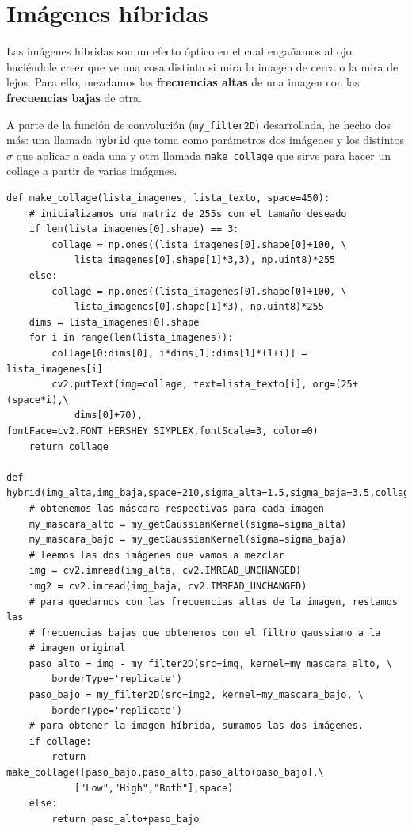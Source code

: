 \documentclass[11pt,a4paper]{article}
\theoremstyle{plain}
\theoremstyle{definition}
\begin{document}
\section{Imágenes híbridas}

Las imágenes híbridas son un efecto óptico en el cual engañamos al ojo haciéndole creer que ve una cosa distinta si mira la imagen de cerca o la mira de lejos. Para ello, mezclamos las \textbf{frecuencias altas} de una imagen con las \textbf{frecuencias bajas} de otra. 

A parte de la función de convolución (\texttt{my\_filter2D}) desarrollada, he hecho dos más: una llamada \texttt{hybrid} que toma como parámetros dos imágenes y los distintos $\sigma$ que aplicar a cada una y otra llamada \texttt{make\_collage} que sirve para hacer un collage a partir de varias imágenes.

\begin{verbatim}
def make_collage(lista_imagenes, lista_texto, space=450):
    # inicializamos una matriz de 255s con el tamaño deseado
    if len(lista_imagenes[0].shape) == 3:
        collage = np.ones((lista_imagenes[0].shape[0]+100, \
            lista_imagenes[0].shape[1]*3,3), np.uint8)*255
    else:
        collage = np.ones((lista_imagenes[0].shape[0]+100, \
            lista_imagenes[0].shape[1]*3), np.uint8)*255
    dims = lista_imagenes[0].shape
    for i in range(len(lista_imagenes)):
        collage[0:dims[0], i*dims[1]:dims[1]*(1+i)] = lista_imagenes[i]
        cv2.putText(img=collage, text=lista_texto[i], org=(25+(space*i),\
            dims[0]+70), fontFace=cv2.FONT_HERSHEY_SIMPLEX,fontScale=3, color=0)
    return collage

def hybrid(img_alta,img_baja,space=210,sigma_alta=1.5,sigma_baja=3.5,collage=True):
    # obtenemos las máscara respectivas para cada imagen
    my_mascara_alto = my_getGaussianKernel(sigma=sigma_alta)
    my_mascara_bajo = my_getGaussianKernel(sigma=sigma_baja)
    # leemos las dos imágenes que vamos a mezclar
    img = cv2.imread(img_alta, cv2.IMREAD_UNCHANGED)
    img2 = cv2.imread(img_baja, cv2.IMREAD_UNCHANGED)
    # para quedarnos con las frecuencias altas de la imagen, restamos las 
    # frecuencias bajas que obtenemos con el filtro gaussiano a la 
    # imagen original
    paso_alto = img - my_filter2D(src=img, kernel=my_mascara_alto, \
        borderType='replicate')
    paso_bajo = my_filter2D(src=img2, kernel=my_mascara_bajo, \
        borderType='replicate')
    # para obtener la imagen híbrida, sumamos las dos imágenes.
    if collage:
        return make_collage([paso_bajo,paso_alto,paso_alto+paso_bajo],\
            ["Low","High","Both"],space)
    else:
        return paso_alto+paso_bajo
\end{verbatim}
\end{document}

